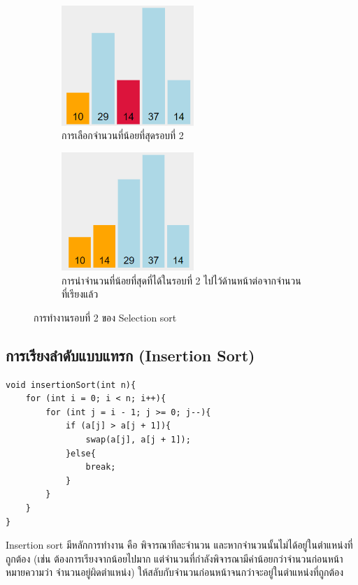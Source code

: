 \begin{figure}[h!]
	\centering
    \begin{subfigure}{.5\textwidth}
    	\centering
        \includegraphics[width=5cm]{images/selection-sort-round-2-1}
        \caption{การเลือกจำนวนที่น้อยที่สุดรอบที่ 2}
        \label{fig:selection_sort_round-2-1}
    \end{subfigure}%
    \begin{subfigure}{.5\textwidth}
    	\centering
        \includegraphics[width=5cm]{images/selection-sort-round-2-2}
        \caption{การนำจำนวนที่น้อยที่สุดที่ได้ในรอบที่ 2 ไปไว้ด้านหน้าต่อจากจำนวนที่เรียงแล้ว}
        \label{fig:selection_sort_round-2-2}
    \end{subfigure}
    \caption{การทำงานรอบที่ 2 ของ Selection sort}
    \label{fig:selection_sort_round-2}
\end{figure}

\newpage

\subsection{การเรียงลำดับแบบแทรก (Insertion Sort)}

\begin{lstlisting}
void insertionSort(int n){
	for (int i = 0; i < n; i++){
		for (int j = i - 1; j >= 0; j--){
			if (a[j] > a[j + 1]){
				swap(a[j], a[j + 1]);
			}else{
				break;
			}
		}
	}
}
\end{lstlisting}

Insertion sort มีหลักการทำงาน คือ พิจารณาทีละจำนวน และหากจำนวนนั้นไม่ได้อยู่ในตำแหน่งที่ถูกต้อง (เช่น ต้องการเรียงจากน้อยไปมาก แต่จำนวนที่กำลังพิจารณามีค่าน้อยกว่าจำนวนก่อนหน้า หมายความว่า จำนวนอยู่ผิดตำแหน่ง) ให้สลับกับจำนวนก่อนหน้าจนกว่าจะอยู่ในตำแหน่งที่ถูกต้อง

